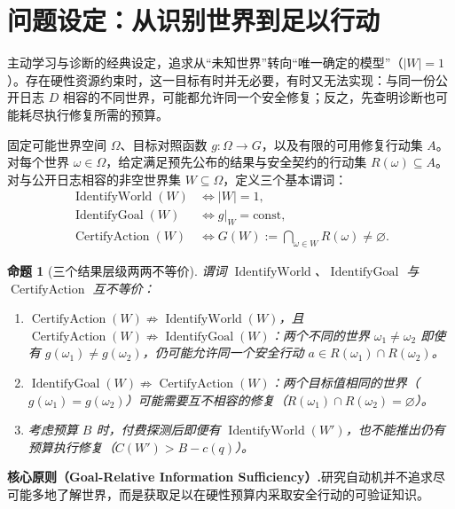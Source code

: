 \documentclass[11pt,a4paper]{article}
\theoremstyle{preprintthm}
\newtheorem{proposition}[theorem]{命题}
\theoremstyle{preprintdef}
\newcommand{\takeaway}[2]{%
  \vspace{4pt}\noindent\colorbox{bgbox}{%
    \parbox{\dimexpr\linewidth-2\fboxsep\relax}{%
      \vspace{3pt}\textbf{\color{primary}#1.}\hspace{0.4em}#2\vspace{3pt}%
    }%
  }\vspace{4pt}%
}
\begin{document}
\section{问题设定：从识别世界到足以行动}

主动学习与诊断的经典设定，追求从“未知世界”转向“唯一确定的模型”（$|W|=1$）。存在硬性资源约束时，这一目标有时并无必要，有时又无法实现：与同一份公开日志 $D$ 相容的不同世界，可能都允许同一个安全修复；反之，先查明诊断也可能耗尽执行修复所需的预算。

固定可能世界空间 $\Omega$、目标对照函数 $g:\Omega\to G$，以及有限的可用修复行动集 $A$。对每个世界 $\omega\in\Omega$，给定满足预先公布的结果与安全契约的行动集 $R(\omega)\subseteq A$。对与公开日志相容的非空世界集 $W\subseteq\Omega$，定义三个基本谓词：
\begin{equation}
  \begin{aligned}
    \operatorname{IdentifyWorld}(W) &\iff |W|=1,\\
    \operatorname{IdentifyGoal}(W)  &\iff g|_W = \mathrm{const},\\
    \operatorname{CertifyAction}(W) &\iff G(W) := \bigcap_{\omega\in W} R(\omega) \ne \varnothing.
  \end{aligned}
\end{equation}

\begin{proposition}[三个结果层级两两不等价]
\label{prop:three_levels}
谓词 $\operatorname{IdentifyWorld}$、$\operatorname{IdentifyGoal}$ 与 $\operatorname{CertifyAction}$ 互不等价：
\begin{enumerate}
  \item $\operatorname{CertifyAction}(W) \not\Rightarrow \operatorname{IdentifyWorld}(W)$，且 $\operatorname{CertifyAction}(W) \not\Rightarrow \operatorname{IdentifyGoal}(W)$：两个不同的世界 $\omega_1\ne\omega_2$ 即使有 $g(\omega_1)\ne g(\omega_2)$，仍可能允许同一个安全行动 $a\in R(\omega_1)\cap R(\omega_2)$。
  \item $\operatorname{IdentifyGoal}(W) \not\Rightarrow \operatorname{CertifyAction}(W)$：两个目标值相同的世界（$g(\omega_1)=g(\omega_2)$）可能需要互不相容的修复（$R(\omega_1)\cap R(\omega_2)=\varnothing$）。
  \item 考虑预算 $B$ 时，付费探测后即便有 $\operatorname{IdentifyWorld}(W')$，也不能推出仍有预算执行修复（$C(W')>B-c(q)$）。
\end{enumerate}
\end{proposition}

\takeaway{核心原则（Goal-Relative Information Sufficiency）}{研究自动机并不追求尽可能多地了解世界，而是获取足以在硬性预算内采取安全行动的可验证知识。}
\end{document}
